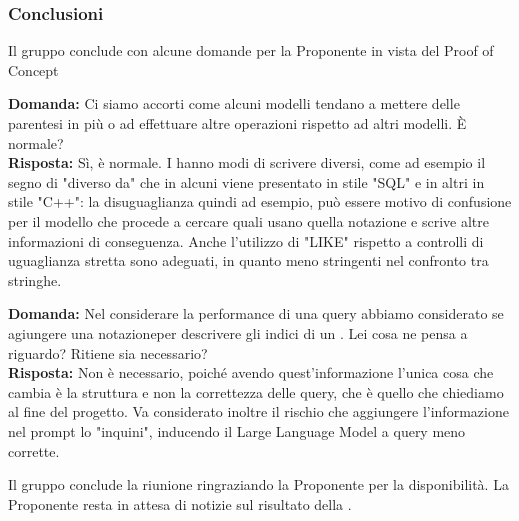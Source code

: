 \subsubsection{Conclusioni}
\par Il gruppo conclude con alcune domande per la Proponente in vista del Proof of Concept

\par \textbf{Domanda:} Ci siamo accorti come alcuni modelli tendano a mettere delle parentesi in più o ad effettuare altre operazioni rispetto ad altri modelli. È normale? \\
\textbf{Risposta:} Sì, è normale. I  hanno modi di scrivere diversi, come ad esempio il segno di "diverso da" che in alcuni viene presentato in stile "SQL" e in altri in stile "C++": la disuguaglianza quindi ad esempio, può essere motivo di confusione per il modello che procede a cercare quali  usano quella notazione e scrive altre informazioni di conseguenza. Anche l'utilizzo di "LIKE" rispetto a controlli di uguaglianza stretta sono adeguati, in quanto meno stringenti nel confronto tra stringhe.

\par \textbf{Domanda:} Nel considerare la performance di una query abbiamo considerato se agiungere una notazioneper descrivere gli indici di un . Lei cosa ne pensa a riguardo? Ritiene sia necessario? \\
\textbf{Risposta:} Non è necessario, poiché avendo quest'informazione l'unica cosa che cambia è la struttura e non la correttezza delle query, che è quello che chiediamo al fine del progetto. Va considerato inoltre il rischio che aggiungere l'informazione nel prompt lo "inquini", inducendo il Large Language Model a query meno corrette.

\par Il gruppo conclude la riunione ringraziando la Proponente per la disponibilità. La Proponente resta in attesa di notizie sul risultato della \RTB.